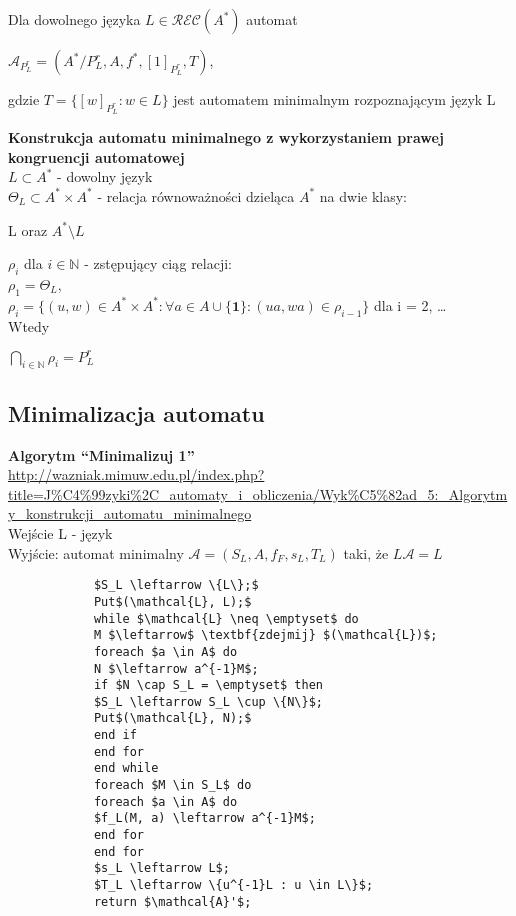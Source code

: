 \documentclass[main.tex]{subfiles}
\begin{document}
    \begin{definition}
        Dla dowolnego języka $L \in \mathcal{REC}(A^{*})$ automat
        \begin{center}
            $\mathcal{A}_{P_{L}^{r}} = (A^{*} / P_{L}^{r}, A, f^{*}, [1]_{P_{L}^{r}}, T)$,
        \end{center}
        gdzie $T = \{[w]_{P_{L}^{r}} : w \in L \}$ jest automatem minimalnym rozpoznającym język L
    \end{definition}
    \begin{definition}
        \textbf{Konstrukcja automatu minimalnego z wykorzystaniem prawej kongruencji automatowej} \\
        $L \subset A^{*}$ - dowolny język \\
        $\Theta_{L} \subset A^* \times A^*$ - relacja równoważności dzieląca $A^*$ na dwie klasy:
        \begin{center}
            L oraz $A^* \setminus L$
        \end{center}
        $\rho_i$ dla $i \in \mathbb{N}$ - zstępujący ciąg relacji: \\
        $\rho_1 = \Theta_L$, \\
        $\rho_i = \{(u, w) \in A^* \times A^* : \forall a \in A \cup \{\textbf{1}\}: (ua, wa) \in \rho_{i-1} \}$ dla i = 2, \ldots \\
        Wtedy
        \begin{center}
            $\bigcap\limits_{i \in \mathbb{N}} \rho_i = P^r_L$
        \end{center}
    \end{definition}


    \subsection{Minimalizacja automatu}
    \begin{definition}
        \textbf{Algorytm ``Minimalizuj 1''} \\
        \url{http://wazniak.mimuw.edu.pl/index.php?title=J\%C4\%99zyki\%2C_automaty_i_obliczenia/Wyk\%C5\%82ad_5:_Algorytmy_konstrukcji_automatu_minimalnego} \\
        Wejście L - język \\
        Wyjście: automat minimalny $\mathcal{A} = (S_L, A, f_F, s_L, T_L)$ taki, że $L\mathcal{A} = L$
        \begin{lstlisting}
            $S_L \leftarrow \{L\};$
            Put$(\mathcal{L}, L);$
            while $\mathcal{L} \neq \emptyset$ do
            M $\leftarrow$ \textbf{zdejmij} $(\mathcal{L})$;
            foreach $a \in A$ do
            N $\leftarrow a^{-1}M$;
            if $N \cap S_L = \emptyset$ then
            $S_L \leftarrow S_L \cup \{N\}$;
            Put$(\mathcal{L}, N);$
            end if
            end for
            end while
            foreach $M \in S_L$ do
            foreach $a \in A$ do
            $f_L(M, a) \leftarrow a^{-1}M$;
            end for
            end for
            $s_L \leftarrow L$;
            $T_L \leftarrow \{u^{-1}L : u \in L\}$;
            return $\mathcal{A}'$;
        \end{lstlisting}
    \end{definition}
\end{document}
